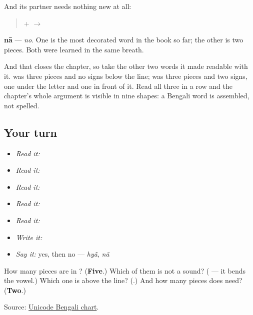 And its partner needs nothing new at all:

\begin{quote}
\textbf{} + \textbf{} $\to$ \textbf{}
\end{quote}

\textbf{nā} — \emph{no}. One is the most decorated word in the book so far; the other is two pieces. Both were learned in the same breath.

And that closes the chapter, so take the other two words it made readable with it. \textbf{} was three pieces and no signs below the line; \textbf{} was three pieces and two signs, one under the letter and one in front of it. Read all three in a row and the chapter's whole argument is visible in nine shapes: a Bengali word is assembled, not spelled.

\subsection*{Your turn}
\begin{itemize}
\raggedright
  \item \emph{Read it:} 
  \item \emph{Read it:} 
  \item \emph{Read it:} 
  \item \emph{Read it:} 
  \item \emph{Read it:} 
  \item \emph{Write it:} 
  \item \emph{Say it:} yes, then no — \emph{hyã}, \emph{nā}
\end{itemize}

\begin{tcolorbox}[breakable,colback=teal!4,colframe=teal!35!black,title={Before you move on}]
How many pieces are in \textbf{}? (\textbf{Five}.) Which of them is not a sound? (\textbf{} — it bends the vowel.) Which one is above the line? (\textbf{}.) And how many pieces does \textbf{} need? (\textbf{Two}.)

Source: \href{https://www.unicode.org/charts/PDF/U0980.pdf}{Unicode Bengali chart}.
\end{tcolorbox}
